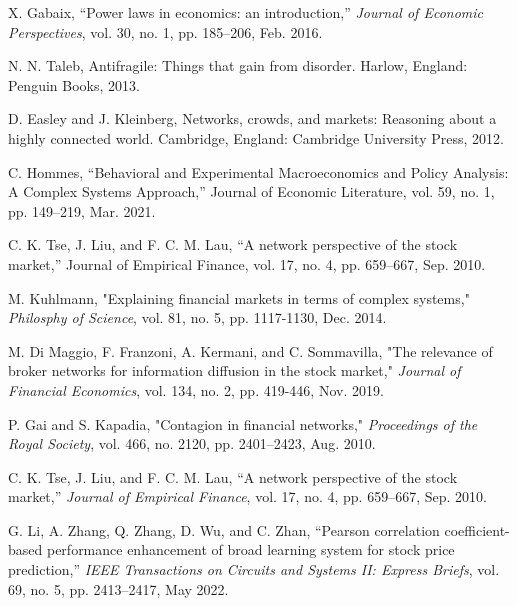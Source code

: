 \documentclass[letterpaper, 11 pt, proceedings]{IEEEtran}
\begin{document}
	
	\begin{thebibliography}{99}	
		X. Gabaix, “Power laws in economics: an introduction,” \textit{Journal of Economic Perspectives}, vol. 30, no. 1, pp. 185–206, Feb. 2016.
		
		N. N. Taleb, Antifragile: Things that gain from disorder. Harlow, England: Penguin Books, 2013.
		
		D. Easley and J. Kleinberg, Networks, crowds, and markets: Reasoning about a highly connected world. Cambridge, England: Cambridge University Press, 2012.
		
	
		C. Hommes, “Behavioral and Experimental Macroeconomics and Policy Analysis: A Complex Systems Approach,” Journal of Economic Literature, vol. 59, no. 1, pp. 149–219, Mar. 2021.
		
		C. K. Tse, J. Liu, and F. C. M. Lau, “A network perspective of the stock market,” Journal of Empirical Finance, vol. 17, no. 4, pp. 659–667, Sep. 2010.
		
		M. Kuhlmann, "Explaining financial markets in terms of complex systems," \textit{Philosphy of Science}, vol. 81, no. 5, pp. 1117-1130, Dec. 2014. %
		
		M. Di Maggio, F. Franzoni, A. Kermani, and C. Sommavilla, "The relevance of broker networks for information diffusion in the stock market," \textit{Journal of Financial Economics}, vol. 134, no. 2, pp. 419-446, Nov. 2019. %
		
		
		P. Gai and S. Kapadia, "Contagion in financial networks," \textit{Proceedings of the Royal Society}, vol. 466, no. 2120, pp. 2401–2423, Aug. 2010.
		
		C. K. Tse, J. Liu, and F. C. M. Lau, “A network perspective of the stock market,” \textit{Journal of Empirical Finance}, vol. 17, no. 4, pp. 659–667, Sep. 2010. %
		
		G. Li, A. Zhang, Q. Zhang, D. Wu, and C. Zhan, “Pearson correlation coefficient-based performance enhancement of broad learning system for stock price prediction,” \textit{IEEE Transactions on Circuits and Systems II: Express Briefs}, vol. 69, no. 5, pp. 2413–2417, May 2022. %
		

\end{thebibliography}
\end{document}
